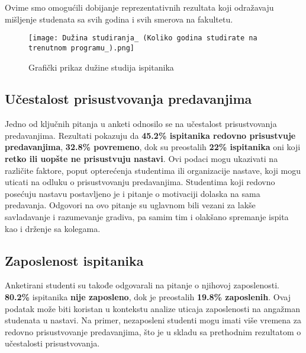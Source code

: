 \documentclass{article}
\begin{document}
Ovime smo omogućili dobijanje reprezentativnih rezultata koji odražavaju mišljenje studenata sa svih godina i svih smerova na fakultetu.

\begin{figure}[h!]
    \centering
    \texttt{[image: Dužina studiranja\_ (Koliko godina studirate na trenutnom programu\_).png]}
    \caption{Grafički prikaz dužine studija ispitanika}
    \label{fig:duzinaStudija}
\end{figure}
\subsection{Učestalost prisustvovanja predavanjima}
Jedno od ključnih pitanja u anketi odnosilo se na učestalost prisustvovanja predavanjima. Rezultati pokazuju da \textbf{45.2\% ispitanika redovno prisustvuje predavanjima}, \textbf{32.8\% povremeno}, dok su preostalih \textbf{22\% ispitanika} oni koji \textbf{retko ili uopšte ne prisustvuju nastavi}. Ovi podaci mogu ukazivati na različite faktore, poput opterećenja studentima ili organizacije nastave, koji mogu uticati na odluku o prisustvovanju predavanjima. Studentima koji redovno posećuju nastavu postavljeno je i pitanje o motivaciji dolaska na sama predavanja. Odgovori na ovo pitanje su uglavnom bili vezani za lakše savladavanje i razumevanje gradiva, pa samim tim i olakšano spremanje ispita kao i drženje sa kolegama.

\subsection{Zaposlenost ispitanika}
Anketirani studenti su takođe odgovarali na pitanje o njihovoj zaposlenosti. \textbf{80.2\%} ispitanika \textbf{nije zaposleno}, dok je preostalih \textbf{19.8\% zaposlenih}. Ovaj podatak može biti koristan u kontekstu analize uticaja zaposlenosti na angažman studenata u nastavi. Na primer, nezaposleni studenti mogu imati više vremena za redovno prisustvovanje predavanjima, što je u skladu sa prethodnim rezultatom o učestalosti prisustvovanja.
\end{document}
